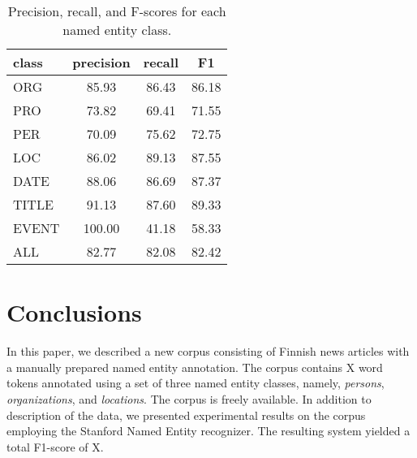 \documentclass[11pt]{article}
\begin{document}
\begin{table}[t!]
\begin{center}
\begin{tabular}{l|ccc}
 class & precision & recall & F1\\
\hline
ORG &  85.93 & 86.43 & 86.18\\
PRO &  73.82 & 69.41 & 71.55\\
PER &  70.09 & 75.62 & 72.75\\
LOC &  86.02 & 89.13 & 87.55\\
DATE &  88.06 & 86.69 & 87.37\\
TITLE &  91.13 & 87.60 & 89.33\\
EVENT &  100.00 & 41.18 & 58.33\\
\hline
ALL & 82.77 & 82.08 & 82.42
\end{tabular}
\end{center}
\caption{Precision, recall, and F-scores for each named entity class.}
\label{tab: precision recall and f-scores}
\end{table}




\section{Conclusions}
\label{sec: conclusions}

In this paper, we described a new corpus consisting of Finnish news articles with a manually prepared named entity annotation. The corpus contains X word tokens annotated using a set of three named entity classes, namely,  \textit{persons}, \textit{organizations}, and \textit{locations}. The corpus is freely available. In addition to description of the data, we presented experimental results on the corpus employing the Stanford Named Entity recognizer. The resulting system yielded a total F1-score of X.



\newpage

%

\end{document}
